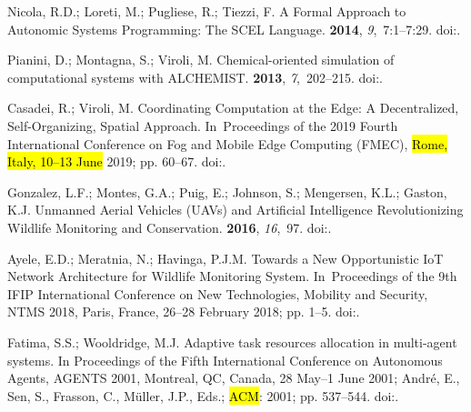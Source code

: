 \documentclass[jsan,article,accept,moreauthors,pdftex]{Definitions/mdpi}
\begin{document}
\begin{thebibliography}{999}
Nicola, R.D.; Loreti, M.; Pugliese, R.; Tiezzi, F.
\newblock A Formal Approach to Autonomic Systems Programming: The {SCEL}
  Language.
 {\bf 2014}, {\em
  9},~7:1--7:29.
\newblock
  doi:{\href{https://doi.org/10.1145/2619998}{}}.

Pianini, D.; Montagna, S.; Viroli, M.
\newblock Chemical-oriented simulation of computational systems with
  {ALCHEMIST}.
 {\bf 2013}, {\em 7},~202--215.
\newblock
  doi:{\href{https://doi.org/10.1057/jos.2012.27}{}}.

Casadei, R.; Viroli, M.
\newblock Coordinating Computation at the Edge: A Decentralized,
  Self-Organizing, Spatial Approach.
\newblock   In~Proceedings of the 2019 Fourth International Conference on Fog and Mobile Edge
  Computing (FMEC), \hl{Rome, Italy, 10--13 June}  2019; pp. 60--67.
\newblock
  doi:{\href{https://doi.org/10.1109/FMEC.2019.8795355}{}}.

Gonzalez, L.F.; Montes, G.A.; Puig, E.; Johnson, S.; Mengersen, K.L.; Gaston,
  K.J.
\newblock Unmanned Aerial Vehicles (UAVs) and Artificial Intelligence
  Revolutionizing Wildlife Monitoring and Conservation.
 {\bf 2016}, {\em 16},~97.
\newblock
  doi:{\href{https://doi.org/10.3390/s16010097}{}}.

Ayele, E.D.; Meratnia, N.; Havinga, P.J.M.
\newblock Towards a New Opportunistic IoT Network Architecture for Wildlife
  Monitoring System.
\newblock  In~Proceedings of the 9th {IFIP} International Conference on New Technologies, Mobility
  and Security, {NTMS} 2018, Paris, France, 26--28 February 2018; pp. 1--5.
\newblock
  doi:{\href{https://doi.org/10.1109/NTMS.2018.8328721}{}}.

Fatima, S.S.; Wooldridge, M.J.
\newblock Adaptive task resources allocation in multi-agent systems.
\newblock  In Proceedings of the Fifth International Conference on Autonomous
  Agents, {AGENTS} 2001, Montreal, QC, Canada, 28 May--1 June 2001; Andr{\'{e}},
  E., Sen, S., Frasson, C., M{\"{u}}ller, J.P., Eds.; \hl{ACM}:  2001; pp.
  537--544.
\newblock
  doi:{\href{https://doi.org/10.1145/375735.376439}{}}.


\end{thebibliography}
\end{document}
